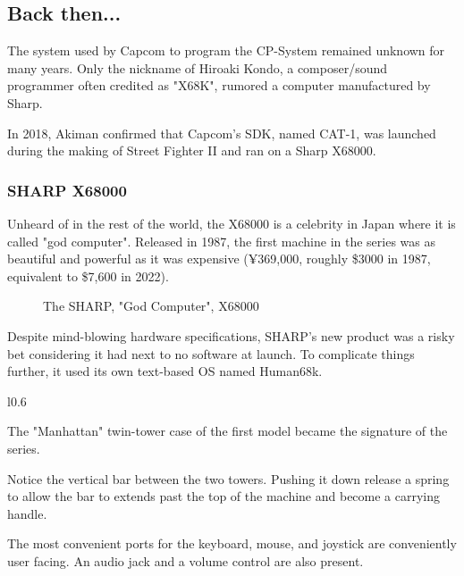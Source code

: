 \pagebreak

\subsection{Back then...}
The system used by Capcom to program the CP-System remained unknown for many years. Only the nickname of Hiroaki Kondo, a composer/sound programmer often credited as "X68K", rumored a computer manufactured by Sharp. 

In 2018,  Akiman confirmed\cite{x68000usage1}\cite{x68000usage2} that Capcom's SDK, named CAT-1, was launched during the making of Street Fighter II and ran on a Sharp X68000.

\subsubsection{SHARP X68000}

Unheard of in the rest of the world, the X68000 is a celebrity in Japan where it is called "god computer". 
Released in 1987, the first machine in the series was as beautiful and powerful as it was expensive (¥369,000, roughly \$3000 in 1987, equivalent to \$7,600 in 2022).

\vfill

 \begin{figure}[H]
\caption*{The SHARP, "God Computer", X68000 }
\end{figure}


Despite mind-blowing hardware specifications, SHARP's new product was a risky bet considering it had next to no software at launch. To complicate things further, it used its own text-based OS named Human68k.


\begin{wrapfigure}[37]{l}{0.6\textwidth}
\centering
{}
\end{wrapfigure}

The "Manhattan" twin-tower case of the first model became the signature of the series. 

Notice the vertical bar between the two towers. Pushing it down release a spring to allow the bar to extends past the top of the machine and become a carrying handle.


The most convenient ports for the keyboard, mouse, and joystick are conveniently user facing. An audio jack and a volume control are also present.

